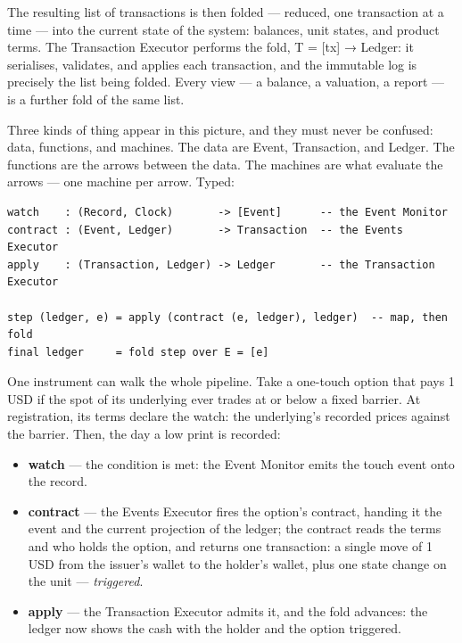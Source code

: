 \documentclass[11pt,a4paper]{article}
\newcommand{\clabel}[1]{\leavevmode\hypertarget{clause-#1}{}%
  \marginpar{\raggedright\scriptsize\ttfamily\textcolor{gray}{#1}}}
\providecommand{\tightlist}{\setlength{\itemsep}{2pt}\setlength{\parskip}{0pt}}
\begin{document}
The resulting list of transactions is then folded --- reduced, one
transaction at a time --- into the current state of the system:
balances, unit states, and product terms. \clabel{C-3.5}The Transaction Executor
performs the fold, T = {[}tx{]} → Ledger: it serialises, validates, and
applies each transaction, and the immutable log is precisely the list
being folded. Every view --- a balance, a valuation, a report --- is a
further fold of the same list.

\clabel{C-3.6}Three kinds of thing appear in this picture, and they must never be
confused: data, functions, and machines. The data are Event,
Transaction, and Ledger. The functions are the arrows between the data.
The machines are what evaluate the arrows --- one machine per arrow.
Typed:

\begin{verbatim}
watch    : (Record, Clock)       -> [Event]      -- the Event Monitor
contract : (Event, Ledger)       -> Transaction  -- the Events Executor
apply    : (Transaction, Ledger) -> Ledger       -- the Transaction Executor

step (ledger, e) = apply (contract (e, ledger), ledger)  -- map, then fold
final ledger     = fold step over E = [e]
\end{verbatim}

One instrument can walk the whole pipeline. Take a one-touch option that
pays 1 USD if the spot of its underlying ever trades at or below a fixed
barrier. At registration, its terms declare the watch: the underlying's
recorded prices against the barrier. Then, the day a low print is
recorded:

\begin{itemize}
\tightlist
\item
  \textbf{watch} --- the condition is met: the Event Monitor emits the
  touch event onto the record.
\item
  \textbf{contract} --- the Events Executor fires the option's contract,
  handing it the event and the current projection of the ledger; the
  contract reads the terms and who holds the option, and returns one
  transaction: a single move of 1 USD from the issuer's wallet to the
  holder's wallet, plus one state change on the unit ---
  \emph{triggered}.
\item
  \textbf{apply} --- the Transaction Executor admits it, and the fold
  advances: the ledger now shows the cash with the holder and the option
  triggered.
\end{itemize}
\end{document}
